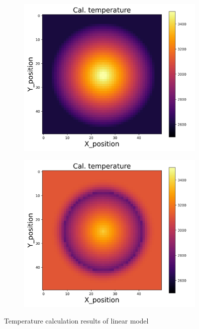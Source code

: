 {\begin{figure}[h]
\begin{minipage}{\textwidth}
\begin{subfigure}{0.27\textwidth}
        \end{subfigure}
        \begin{subfigure}{0.27\textwidth}
            \centering
            \includegraphics[width=\textwidth]{figures/raw_data/32/T3500/linear/T_cal.jpg}
        \end{subfigure}
        \begin{subfigure}{0.27\textwidth}
            \centering
            \includegraphics[width=\textwidth]{figures/raw_data/33/T3500/linear/T_cal.jpg}
        \end{subfigure}
    \end{minipage}
    \caption{Temperature calculation results of linear model}  
\end{figure}

}
